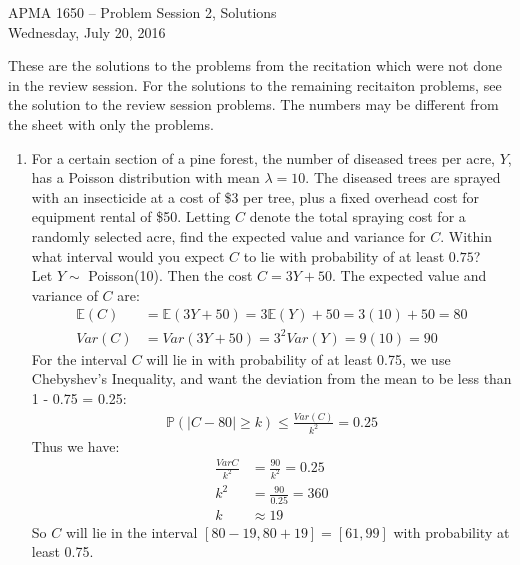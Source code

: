 \documentclass[12pt]{article}
\def\P{{\mathbb P}}
\def\E{{\mathbb E}}
\begin{document}
\title{}
\author{\vspace{-10ex} }

\begin{center}
{\LARGE APMA 1650 -- Problem Session 2, Solutions}\\
\vspace{5mm}
{\large Wednesday, July 20, 2016}\\
\end{center}

These are the solutions to the problems from the recitation which were not done in the review session. For the solutions to the remaining recitaiton problems, see the solution to the review session problems. The numbers may be different from the sheet with only the problems.

\begin{enumerate}

\item For a certain section of a pine forest, the number of diseased trees per acre, $Y$, has a Poisson distribution with mean $\lambda = 10$. The diseased trees are sprayed with an insecticide at a cost of \$3 per tree, plus a fixed overhead cost for equipment rental of \$50. Letting $C$ denote the total spraying cost for a randomly selected acre, find the expected value and variance for $C$. Within what interval would you expect $C$ to lie with probability of at least $0.75$?\\

Let $Y \sim$ Poisson(10). Then the cost $C = 3 Y + 50$. The expected value and variance of $C$ are:
\begin{align*}
\E(C) &= \E(3Y + 50) = 3 \E(Y) + 50 = 3(10) + 50 = 80 \\
Var(C) &= Var(3Y + 50) = 3^2 Var(Y) = 9(10) = 90
\end{align*}
For the interval $C$ will lie in with probability of at least 0.75, we use Chebyshev's Inequality, and want the deviation from the mean to be less than 1 - 0.75 = 0.25:
\begin{align*}
\P( |C - 80| \geq k ) \leq \frac{Var(C)}{k^2} = 0.25
\end{align*}
Thus we have:
\begin{align*}
\frac{Var{C}}{k^2} &= \frac{90}{k^2} = 0.25\\
k^2 &= \frac{90}{0.25} = 360\\
k &\approx 19
\end{align*}
So $C$ will lie in the interval $[80 - 19, 80 + 19] = [61, 99]$ with probability at least 0.75.


\end{enumerate}
\end{document}

